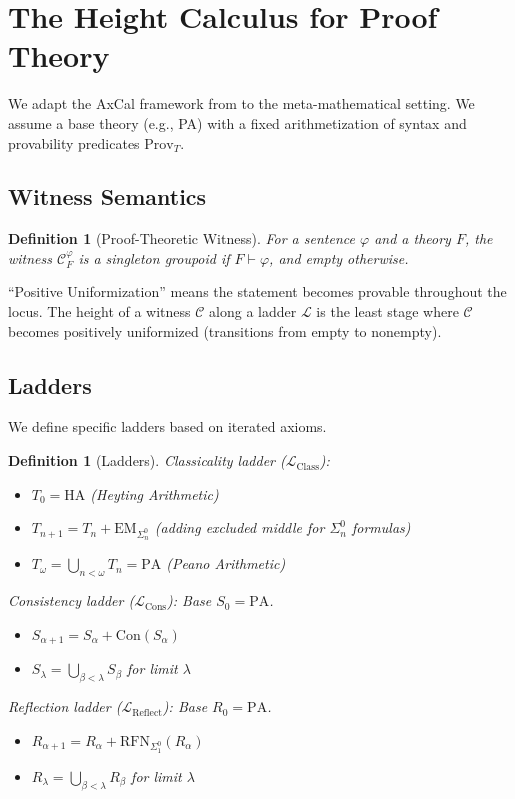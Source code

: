 \documentclass[11pt]{article}
\newtheorem{definition}[theorem]{Definition}
\newcommand{\PA}{\mathrm{PA}}
\newcommand{\HA}{\mathrm{HA}}
\newcommand{\Con}{\mathrm{Con}}
\newcommand{\RFNSigOne}{\mathrm{RFN}_{\Sigma^0_1}}
\newcommand{\LCons}{\mathcal{L}_{\mathrm{Cons}}}
\newcommand{\LReflect}{\mathcal{L}_{\mathrm{Reflect}}}
\newcommand{\LClass}{\mathcal{L}_{\mathrm{Class}}}
\newcommand{\Prov}{\mathrm{Prov}}
\newcommand{\EM}{\mathrm{EM}}
\begin{document}
\section{The Height Calculus for Proof Theory}
We adapt the AxCal framework from \cite{Paper3a} to the meta-mathematical setting. We assume a base theory (e.g., PA) with a fixed arithmetization of syntax and provability predicates $\Prov_T$.

\subsection{Witness Semantics}
\begin{definition}[Proof-Theoretic Witness]
For a sentence $\varphi$ and a theory $F$, the witness $\mathcal C^\varphi_F$ is a singleton groupoid if $F\vdash \varphi$, and empty otherwise.
\end{definition}
``Positive Uniformization'' means the statement becomes provable throughout the locus. The height of a witness $\mathcal{C}$ along a ladder $\mathcal{L}$ is the least stage where $\mathcal{C}$ becomes positively uniformized (transitions from empty to nonempty).

\subsection{Ladders}
We define specific ladders based on iterated axioms.

\begin{definition}[Ladders]
\emph{Classicality ladder ($\LClass$):} 
\begin{itemize}
\item $T_0 = \HA$ (Heyting Arithmetic)
\item $T_{n+1} = T_n + \EM_{\Sigma^0_n}$ (adding excluded middle for $\Sigma^0_n$ formulas)
\item $T_\omega = \bigcup_{n<\omega} T_n = \PA$ (Peano Arithmetic)
\end{itemize}

\emph{Consistency ladder ($\LCons$):} Base $S_0=\PA$.
\begin{itemize}
\item $S_{\alpha+1} = S_\alpha + \Con(S_\alpha)$
\item $S_\lambda = \bigcup_{\beta<\lambda} S_\beta$ for limit $\lambda$
\end{itemize}

\emph{Reflection ladder ($\LReflect$):} Base $R_0=\PA$.
\begin{itemize}
\item $R_{\alpha+1} = R_\alpha + \RFNSigOne(R_\alpha)$
\item $R_\lambda = \bigcup_{\beta<\lambda} R_\beta$ for limit $\lambda$
\end{itemize}
\end{definition}
\end{document}
